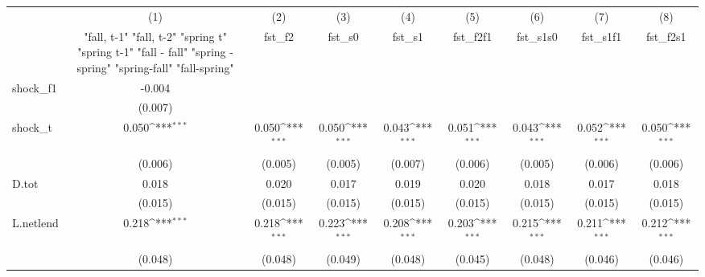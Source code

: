 {
\def\sym#1{\ifmmode^{#1}\else\(^{#1}\)\fi}
\begin{tabular}{l*{8}{c}}
\toprule
            &\multicolumn{1}{c}{(1)}&\multicolumn{1}{c}{(2)}&\multicolumn{1}{c}{(3)}&\multicolumn{1}{c}{(4)}&\multicolumn{1}{c}{(5)}&\multicolumn{1}{c}{(6)}&\multicolumn{1}{c}{(7)}&\multicolumn{1}{c}{(8)}\\
            &\multicolumn{1}{c}{  "fall, t-1" "fall, t-2" "spring t" "spring t-1"  "fall - fall" "spring - spring" "spring-fall" "fall-spring" }&\multicolumn{1}{c}{fst\_f2}&\multicolumn{1}{c}{fst\_s0}&\multicolumn{1}{c}{fst\_s1}&\multicolumn{1}{c}{fst\_f2f1}&\multicolumn{1}{c}{fst\_s1s0}&\multicolumn{1}{c}{fst\_s1f1}&\multicolumn{1}{c}{fst\_f2s1}\\
\midrule
shock\_f1    &      -0.004         &                     &                     &                     &                     &                     &                     &                     \\
            &     (0.007)         &                     &                     &                     &                     &                     &                     &                     \\
\addlinespace
shock\_t     &       0.050\sym{***}&       0.050\sym{***}&       0.050\sym{***}&       0.043\sym{***}&       0.051\sym{***}&       0.043\sym{***}&       0.052\sym{***}&       0.050\sym{***}\\
            &     (0.006)         &     (0.005)         &     (0.005)         &     (0.007)         &     (0.006)         &     (0.005)         &     (0.006)         &     (0.006)         \\
\addlinespace
D.tot       &       0.018         &       0.020         &       0.017         &       0.019         &       0.020         &       0.018         &       0.017         &       0.018         \\
            &     (0.015)         &     (0.015)         &     (0.015)         &     (0.015)         &     (0.015)         &     (0.015)         &     (0.015)         &     (0.015)         \\
\addlinespace
L.netlend   &       0.218\sym{***}&       0.218\sym{***}&       0.223\sym{***}&       0.208\sym{***}&       0.203\sym{***}&       0.215\sym{***}&       0.211\sym{***}&       0.212\sym{***}\\
            &     (0.048)         &     (0.048)         &     (0.049)         &     (0.048)         &     (0.045)         &     (0.048)         &     (0.046)         &     (0.046)         \\

\end{tabular}}
